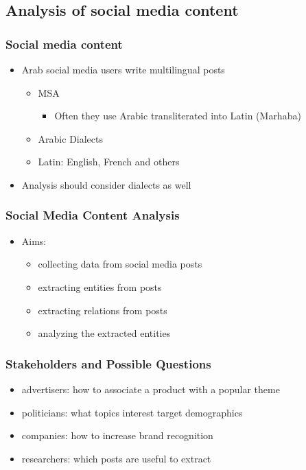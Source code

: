 \documentclass[xcolor=table]{beamer}
\newcommand{\bi}{\begin{itemize}}
\newcommand{\ei}{\end{itemize}}
\newcommand{\I}{\item}
\begin{document}
\subsection{Analysis of social media content}
\begin{frame}
\frametitle{Social media content}
\begin{itemize}
\item Arab social media users write multilingual posts
\begin{itemize}
\item MSA 
  \bi  
  \I Often they use Arabic transliterated into Latin (Marhaba) 
  \ei 
\item Arabic Dialects
\item Latin: English, French and others
\end{itemize}
\item Analysis should consider dialects as well
\end{itemize}
\end{frame}

\begin{frame}
\frametitle{Social Media Content Analysis}
\begin{itemize}
\item Aims:
\begin{itemize}
\item collecting data from social media posts
\item extracting entities from posts 
\item extracting relations from posts 
\item analyzing the extracted entities
\end{itemize}
\end{itemize}

\end{frame}

\begin{frame}

  \frametitle{ Stakeholders and Possible Questions} 
  
  \bi
  \I advertisers: how to associate a product with a popular theme
  \I politicians: what topics interest target demographics
  \I companies: how to increase brand recognition
  \I researchers: which posts are useful to extract
  \ei 
\end{frame}
\end{document}

